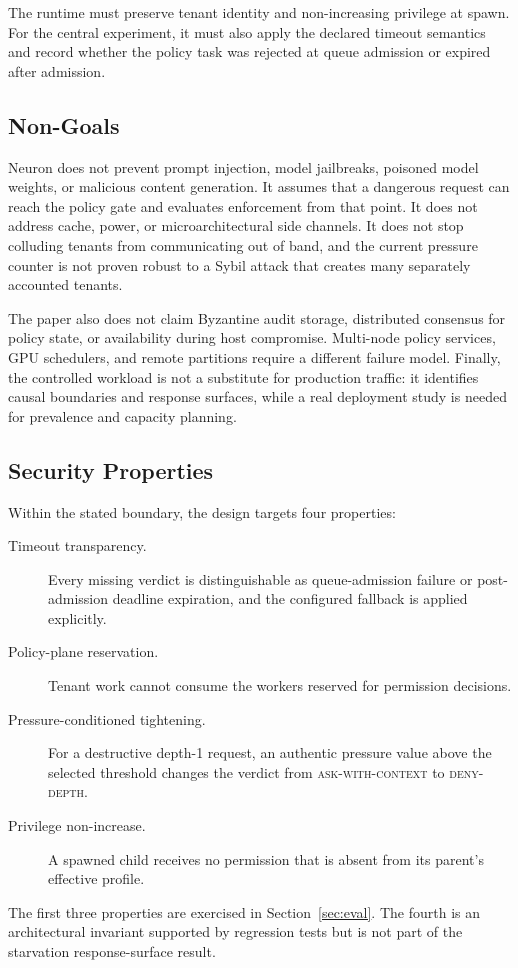 The runtime must preserve tenant identity and non-increasing privilege at
spawn. For the central experiment, it must also apply the declared timeout
semantics and record whether the policy task was rejected at queue admission
or expired after admission.

\subsection{Non-Goals}

Neuron does not prevent prompt injection, model jailbreaks, poisoned model
weights, or malicious content generation. It assumes that a dangerous
request can reach the policy gate and evaluates enforcement from that point.
It does not address cache, power, or microarchitectural side channels. It
does not stop colluding tenants from communicating out of band, and the
current pressure counter is not proven robust to a Sybil attack that creates
many separately accounted tenants.

The paper also does not claim Byzantine audit storage, distributed consensus
for policy state, or availability during host compromise. Multi-node policy
services, GPU schedulers, and remote partitions require a different failure
model. Finally, the controlled workload is not a substitute for production
traffic: it identifies causal boundaries and response surfaces, while a real
deployment study is needed for prevalence and capacity planning.

\subsection{Security Properties}

Within the stated boundary, the design targets four properties:

\begin{description}
  \item[Timeout transparency.] Every missing verdict is distinguishable as
  queue-admission failure or post-admission deadline expiration, and the
  configured fallback is applied explicitly.
  \item[Policy-plane reservation.] Tenant work cannot consume the workers
  reserved for permission decisions.
  \item[Pressure-conditioned tightening.] For a destructive depth-1 request,
  an authentic pressure value above the selected threshold changes the
  verdict from \textsc{ask-with-context} to \textsc{deny-depth}.
  \item[Privilege non-increase.] A spawned child receives no permission that
  is absent from its parent's effective profile.
\end{description}

The first three properties are exercised in Section~\ref{sec:eval}. The
fourth is an architectural invariant supported by regression tests but is
not part of the starvation response-surface result.
